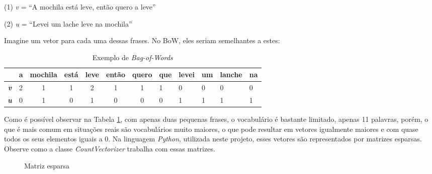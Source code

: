 \begin{samepage}
(1) \textit{v} =  “A mochila está leve, então quero a leve”

\nopagebreak

(2) \textit{u} = “Levei um lache leve na mochila”
\end{samepage}

Imagine um vetor para cada uma dessas frases. No BoW, eles seriam semelhantes a estes:

\begin{center}
\begin{table}[htbp]
\centering
\begin{tabular}{ccccccclllll}
\hline
 & \textbf{a} & \textbf{mochila} & \textbf{está} & \textbf{leve} & \textbf{então} & \textbf{quero} & \textbf{que} & \textbf{levei} & \textbf{um} & \textbf{lanche} & \textbf{na} \\ \hline
\textbf{\textit{v}} & 2 & 1 & 1 & 2 & 1 & 1 & 1 & 0 & 0 & 0 & 0 \\
\textbf{\textit{u}} & 0 & 1 & 0 & 1 & 0 & 0 & 0 & 1 & 1 & 1 & 1
\end{tabular}
\caption{Exemplo de \textit{Bag-of-Words}}
\label{bow}
\end{table}
\end{center}

Como é possível observar na Tabela \ref{bow}, com apenas duas pequenas frases, o vocabulário é bastante limitado, apenas 11 palavras, porém, o que é mais comum em situações reais são vocabulários muito maiores, o que pode resultar em vetores igualmente maiores e com quase todos os seus elementos iguais a 0. Na linguagem \textit{Python}, utilizada neste projeto, esses vetores são representados por matrizes esparsas. Observe como a classe \textit{CountVectorizer} trabalha com essas matrizes.

\begin{figure}[!htb]
    \caption{\label{fig:sparse_matrix_cv} Matriz esparsa}
\end{figure}

